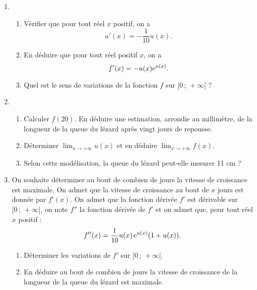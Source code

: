 \documentclass[11pt,fleqn, openany]{book} %
\begin{document}
\begin{exercise}[topic=lim24, subtitle={(Amérique du Sud 2018)}]
\begin{enumerate}
\item \begin{enumerate}
\item Vérifier que pour tout réel $x$ positif, on a
\[u'(x)=-\dfrac{1}{10}u(x).\]
\item En déduire que pour tout réel positif $x$, on a 
\[f'(x)= -u(x) \mathrm{e}^{u(x)} .\]
\item Quel est le sens de variations de la fonction $f$ sur $[0\,;\,+\infty [$ ?\end{enumerate}
\vskip10pt
\item \begin{enumerate}
\item Calculer $f(20)$. En déduire une estimation, arrondie au millimètre, de la longueur de la queue du lézard après vingt jours de repousse.
\vskip5pt
\item Déterminer $\displaystyle \lim_{x\to + \infty} u(x)$ et en déduire $\displaystyle \lim_{x \to + \infty} f(x)$.
\vskip5pt
\item Selon cette modélisation, la queue du lézard peut-elle mesurer 11 cm ?\end{enumerate}
\vskip10pt
\item On souhaite déterminer au bout de combien de jours la vitesse de croissance est maximale.
On admet que la vitesse de croissance au bout de $x$ jours est donnée par $f'(x)$.
On admet que la fonction dérivée $f'$ est dérivable sur $[0\,;\,+\infty [$, on note $f''$ la fonction dérivée de $f'$ et on admet que, pour tout réel $x$ positif :
\[f''(x)=\dfrac{1}{10}u(x)\, \mathrm{e}^{u(x)}(1+u(x)).\]
 \begin{enumerate}
 \item Déterminer les variations de $f'$ sur $[0\,;\,+\infty [$.
 \vskip5pt
\item En déduire au bout de combien de jours la vitesse de croissance de la longueur de la queue du lézard est maximale.\end{enumerate}\end{enumerate}\end{exercise}
\end{document}
